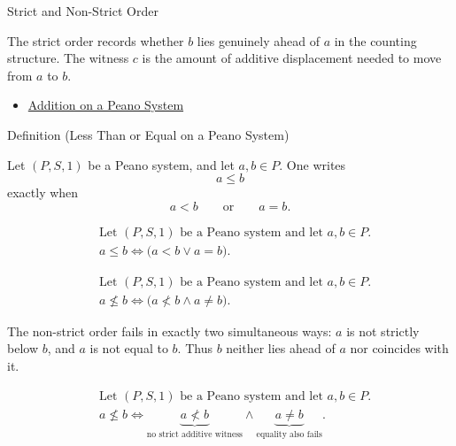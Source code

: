 \begin{topicbox}{Strict and Non-Strict Order}
\begin{remark*}[Interpretation]
The strict order records whether $b$ lies genuinely ahead of $a$ in the
counting structure. The witness $c$ is the amount of additive displacement
needed to move from $a$ to $b$.
\end{remark*}

\begin{dependencies}
\begin{itemize}
  \item \hyperref[def:addition-on-peano-system]{Addition on a Peano System}
\end{itemize}
\end{dependencies}

\begin{definitionbox}{Definition (Less Than or Equal on a Peano System)}
\begin{definition}
\label{def:less-than-or-equal-on-peano-system}
Let $(P,S,1)$ be a Peano system, and let $a,b \in P$. One writes
\[
a \le b
\]
exactly when
\[
a<b
\qquad\text{or}\qquad
a=b.
\]
\end{definition}
\end{definitionbox}

\begin{remark*}
\[
\begin{aligned}
&\text{Let } (P,S,1) \text{ be a Peano system and let } a,b \in P.\\
&a \le b
\Longleftrightarrow
\bigl(a<b \lor a=b\bigr).
\end{aligned}
\]
\end{remark*}

\begin{remark*}
\[
\begin{aligned}
&\text{Let } (P,S,1) \text{ be a Peano system and let } a,b \in P.\\
&a \not\le b
\Longleftrightarrow
\bigl(a \not< b \land a \neq b\bigr).
\end{aligned}
\]
\end{remark*}

\begin{remark*}
The non-strict order fails in exactly two simultaneous ways: $a$ is not
strictly below $b$, and $a$ is not equal to $b$. Thus $b$ neither lies ahead
of $a$ nor coincides with it.
\end{remark*}

\begin{remark*}
\[
\begin{aligned}
&\text{Let } (P,S,1) \text{ be a Peano system and let } a,b \in P.\\
&a \not\le b
\Longleftrightarrow
\underbrace{a \not< b}_{\text{no strict additive witness}}
\land
\underbrace{a \neq b}_{\text{equality also fails}}.
\end{aligned}
\]
\end{remark*}


\end{topicbox}
